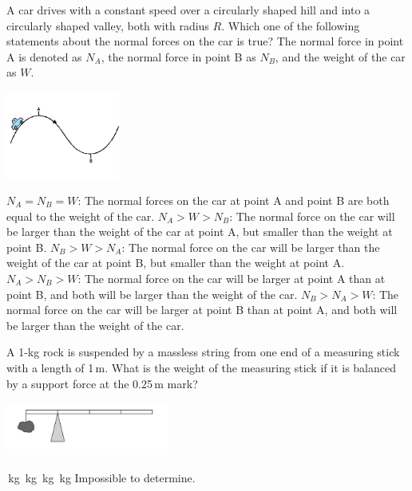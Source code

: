 \documentclass[letterpaper,addpoints,answers]{exam}
\begin{document}
\begin{questions}

\printanswers


\begin{question}[5]
\begin{multicols}{2}
A car drives with a constant speed over a circularly shaped hill and into a circularly shaped valley, both with radius $R$. Which one of the following statements about the normal forces on the car is true? The normal force in point A is denoted as $N_A$, the normal force in point B as $N_B$, and the weight of the car as $W$.
\begin{center}
\includegraphics[width=0.28\textwidth]{car_hill}
\end{center}
\end{multicols}
\begin{checkboxes}
 \choice $N_A = N_B = W$: The normal forces on the car at point A and point B are both equal to the weight of the car.
 \choice $N_A > W > N_B$: The normal force on the car will be larger than the weight of the car at point A, but smaller than the weight at point B.
 \correctchoice $N_B > W > N_A$: The normal force on the car will be larger than the weight of the car at point B, but smaller than the weight at point A.
 \choice $N_A > N_B > W$: The normal force on the car will be larger at point A than at point B, and both will be larger than the weight of the car.
 \choice $N_B > N_A > W$: The normal force on the car will be larger at point B than at point A, and both will be larger than the weight of the car.
\end{checkboxes}
\end{question}

\begin{question}[5]
\begin{multicols}{2}
A 1-kg rock is suspended by a massless string from one end of a measuring stick with a length of 1\,m. What is the weight of the measuring stick if it is balanced by a support force at the 0.25\,m mark?
\begin{center}
\includegraphics[width=0.4\textwidth]{rock_balance}
\end{center}
\end{multicols}
\begin{checkboxes}
 \,kg
 \,kg
 \,kg
 \,kg
 \choice Impossible to determine.
\end{checkboxes}
\end{question}


\end{questions}
\end{document}
